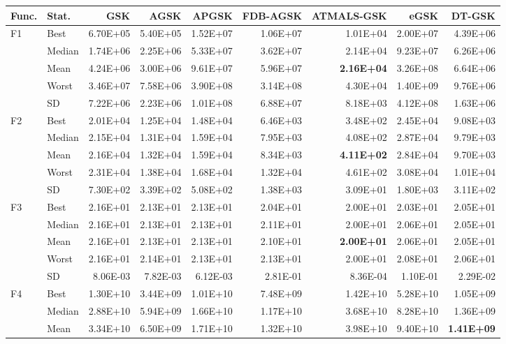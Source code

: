 \documentclass[10pt,a4paper]{article}
\newcommand{\bestval}[1]{\textbf{#1}}
\begin{document}
\begin{table}[p]
\zebra
\begin{tabular}{llrrrrrrr}
\toprule
\textbf{Func.} & \textbf{Stat.} & \textbf{GSK} & \textbf{AGSK} & \textbf{APGSK} & \textbf{FDB-AGSK} & \textbf{ATMALS-GSK} & \textbf{eGSK} & \textbf{DT-GSK} \\
\midrule
F1 & Best & 6.70E+05 & 5.40E+05 & 1.52E+07 & 1.06E+07 & 1.01E+04 & 2.00E+07 & 4.39E+06 \\
 & Median & 1.74E+06 & 2.25E+06 & 5.33E+07 & 3.62E+07 & 2.14E+04 & 9.23E+07 & 6.26E+06 \\
 & Mean & 4.24E+06 & 3.00E+06 & 9.61E+07 & 5.96E+07 & \bestval{2.16E+04} & 3.26E+08 & 6.64E+06 \\
 & Worst & 3.46E+07 & 7.58E+06 & 3.90E+08 & 3.14E+08 & 4.30E+04 & 1.40E+09 & 9.76E+06 \\
 & SD & 7.22E+06 & 2.23E+06 & 1.01E+08 & 6.88E+07 & 8.18E+03 & 4.12E+08 & 1.63E+06 \\
\midrule
F2 & Best & 2.01E+04 & 1.25E+04 & 1.48E+04 & 6.46E+03 & 3.48E+02 & 2.45E+04 & 9.08E+03 \\
 & Median & 2.15E+04 & 1.31E+04 & 1.59E+04 & 7.95E+03 & 4.08E+02 & 2.87E+04 & 9.79E+03 \\
 & Mean & 2.16E+04 & 1.32E+04 & 1.59E+04 & 8.34E+03 & \bestval{4.11E+02} & 2.84E+04 & 9.70E+03 \\
 & Worst & 2.31E+04 & 1.38E+04 & 1.68E+04 & 1.32E+04 & 4.61E+02 & 3.08E+04 & 1.01E+04 \\
 & SD & 7.30E+02 & 3.39E+02 & 5.08E+02 & 1.38E+03 & 3.09E+01 & 1.80E+03 & 3.11E+02 \\
\midrule
F3 & Best & 2.16E+01 & 2.13E+01 & 2.13E+01 & 2.04E+01 & 2.00E+01 & 2.03E+01 & 2.05E+01 \\
 & Median & 2.16E+01 & 2.13E+01 & 2.13E+01 & 2.11E+01 & 2.00E+01 & 2.06E+01 & 2.05E+01 \\
 & Mean & 2.16E+01 & 2.13E+01 & 2.13E+01 & 2.10E+01 & \bestval{2.00E+01} & 2.06E+01 & 2.05E+01 \\
 & Worst & 2.16E+01 & 2.14E+01 & 2.13E+01 & 2.13E+01 & 2.00E+01 & 2.08E+01 & 2.06E+01 \\
 & SD & 8.06E-03 & 7.82E-03 & 6.12E-03 & 2.81E-01 & 8.36E-04 & 1.10E-01 & 2.29E-02 \\
\midrule
F4 & Best & 1.30E+10 & 3.44E+09 & 1.01E+10 & 7.48E+09 & 1.42E+10 & 5.28E+10 & 1.05E+09 \\
 & Median & 2.88E+10 & 5.94E+09 & 1.66E+10 & 1.17E+10 & 3.68E+10 & 8.28E+10 & 1.36E+09 \\
 & Mean & 3.34E+10 & 6.50E+09 & 1.71E+10 & 1.32E+10 & 3.98E+10 & 9.40E+10 & \bestval{1.41E+09} \\

\end{tabular}
\end{table}
\end{document}
